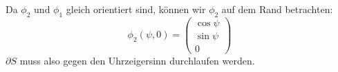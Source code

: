 \documentclass[a4paper]{scrartcl}
\begin{document}
\begin{aufgabe}
\begin{enumerate}[a)]
				\newpage

				Da $\phi_2$ und $\phi_1$ gleich orientiert sind, können wir $\phi_2$ auf dem Rand betrachten:
				\[
					\phi_2(\psi, 0) = \begin{pmatrix}
						\cos \psi \\
						\sin \psi \\
						0
					\end{pmatrix}
				\]
				$\partial S$ muss also gegen den Uhrzeigersinn durchlaufen werden.

		\end{enumerate}
	\end{aufgabe}
\end{document}
